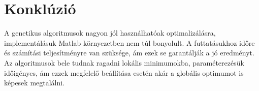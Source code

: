 \section{Konklúzió}
A genetikus algoritmusok nagyon jól használhatóak optimalizálásra, implementálásuk Matlab környezetben nem túl bonyolult. A futtatásukhoz időre és számítási teljesítményre van szüksége, ám ezek se garantálják a jó eredményt. Az algoritmusok bele tudnak ragadni lokális minimumokba, paraméterezésük időigényes, ám ezzek megfelelő beállítása esetén akár a globális optimumot is képesek megtalálni.


